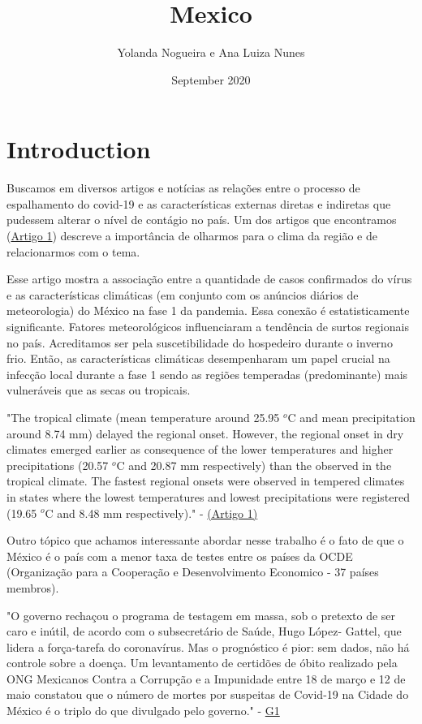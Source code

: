 \documentclass{article}
\title{Mexico}
\author{Yolanda Nogueira e Ana Luiza Nunes}
\date{September 2020}
\begin{document}
\maketitle

\section{Introduction}

Buscamos em diversos artigos e notícias as relações entre o processo de espalhamento do covid-19 e as características externas diretas e indiretas que pudessem alterar o nível de contágio no país. 
Um dos artigos que encontramos (\href{https://www.sciencedirect.com/science/article/pii/S0048969720330771}{Artigo 1}) descreve a importância de olharmos para o clima da região e de relacionarmos com o tema. 

Esse artigo mostra a associação entre a quantidade de casos confirmados do vírus e as características climáticas (em conjunto com os anúncios diários de meteorologia) do México na fase 1 da pandemia. Essa conexão é estatisticamente significante. Fatores meteorológicos influenciaram a tendência de surtos regionais no país. Acreditamos ser pela suscetibilidade do hospedeiro durante o inverno frio. Então, as características climáticas desempenharam um papel crucial na infecção local durante a fase 1 sendo as regiões temperadas (predominante) mais vulneráveis que as secas ou tropicais.

\begin{center}
    "The tropical climate (mean temperature
around 25.95 $^o$C and mean precipitation around 8.74 mm) delayed the regional onset. However, the regional
onset in dry climates emerged earlier as consequence of the lower temperatures and higher precipitations
(20.57 $^o$C and 20.87 mm respectively) than the observed in the tropical climate. The fastest regional onsets
were observed in tempered climates in states where the lowest temperatures and lowest precipitations were
registered (19.65 $^o$C and 8.48 mm respectively)."   - \href{https://www.sciencedirect.com/science/article/pii/S0048969720330771}{(Artigo 1)}
\end{center}

Outro tópico que achamos interessante abordar nesse trabalho é o fato de que o México é o país com a menor taxa de testes entre os países da OCDE (Organização para a Cooperação e Desenvolvimento Economico - 37 países membros). 

\begin{center}
    "O governo rechaçou o programa de testagem em massa, sob o pretexto de ser caro e inútil, de acordo com o subsecretário de Saúde, Hugo López- Gattel, que lidera a força-tarefa do coronavírus. Mas o prognóstico é pior: sem dados, não há controle sobre a doença. Um levantamento de certidões de óbito realizado pela ONG Mexicanos Contra a Corrupção e a Impunidade entre 18 de março e 12 de maio constatou que o número de mortes por suspeitas de Covid-19 na Cidade do México é o triplo do que divulgado pelo governo." - \href{https://g1.globo.com/mundo/blog/sandra-cohen/post/2020/06/05/mexico-sai-da-quarentena-no-pico-da-pandemia.ghtml}{G1}
\end{center}
\end{document}
